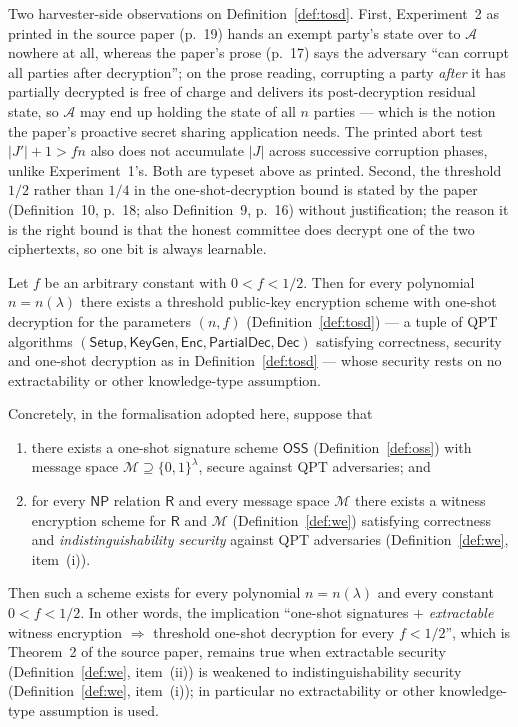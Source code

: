 \documentclass{conjura-conjecture}
\newcommand{\NP}{\mathsf{NP}}
\newcommand{\Rel}{\mathsf{R}}
\newcommand{\Msp}{\mathcal{M}}
\newcommand{\Setup}{\mathsf{Setup}}
\newcommand{\KeyGen}{\mathsf{KeyGen}}
\newcommand{\Enc}{\mathsf{Enc}}
\newcommand{\Dec}{\mathsf{Dec}}
\newcommand{\PartialDec}{\mathsf{PartialDec}}
\newcommand{\OSS}{\mathsf{OSS}}
\begin{document}
\begin{remark}\label{rem:tosd}
Two harvester-side observations on Definition~\ref{def:tosd}. First,
Experiment~2 as printed in the source paper (p.~19) hands an exempt
party's state over to $\mathcal{A}$ nowhere at all, whereas the
paper's prose (p.~17) says the adversary ``can corrupt all parties
after decryption''; on the prose reading, corrupting a party
\emph{after} it has partially decrypted is free of charge and delivers
its post-decryption residual state, so $\mathcal{A}$ may end up
holding the state of all $n$ parties --- which is the notion the
paper's proactive secret sharing application needs. The printed abort
test $\lvert J' \rvert + 1 > f n$ also does not accumulate $\lvert J
\rvert$ across successive corruption phases, unlike Experiment~1's.
Both are typeset above as printed. Second, the threshold $1/2$ rather
than $1/4$ in the one-shot-decryption bound is stated by the paper
(Definition~10, p.~18; also Definition~9, p.~16) without
justification; the reason it is the right bound is that the honest
committee does decrypt one of the two ciphertexts, so one bit is
always learnable.
\end{remark}

\begin{conjecture}\label{conj:main}
Let $f$ be an arbitrary constant with $0 < f < 1/2$. Then for every
polynomial $n = n(\lambda)$ there exists a threshold public-key
encryption scheme with one-shot decryption for the parameters $(n, f)$
(Definition~\ref{def:tosd}) --- a tuple of QPT algorithms $(\Setup,
\KeyGen, \Enc, \PartialDec, \Dec)$ satisfying correctness, security
and one-shot decryption as in Definition~\ref{def:tosd} --- whose
security rests on no extractability or other knowledge-type
assumption.

Concretely, in the formalisation adopted here, suppose that
\begin{enumerate}[leftmargin=1.6em]
  \item[(i)] there exists a one-shot signature scheme $\OSS$
    (Definition~\ref{def:oss}) with message space $\Msp \supseteq
    \{0,1\}^{\lambda}$, secure against QPT adversaries; and
  \item[(ii)] for every $\NP$ relation $\Rel$ and every message space
    $\Msp$ there exists a witness encryption scheme for $\Rel$ and
    $\Msp$ (Definition~\ref{def:we}) satisfying correctness and
    \emph{indistinguishability security} against QPT adversaries
    (Definition~\ref{def:we}, item~(i)).
\end{enumerate}
Then such a scheme exists for every polynomial $n = n(\lambda)$ and
every constant $0 < f < 1/2$. In other words, the implication
``one-shot signatures $+$ \emph{extractable} witness encryption
$\Rightarrow$ threshold one-shot decryption for every $f < 1/2$'',
which is Theorem~2 of the source paper, remains true when extractable
security (Definition~\ref{def:we}, item~(ii)) is weakened to
indistinguishability security (Definition~\ref{def:we}, item~(i)); in
particular no extractability or other knowledge-type assumption is
used.
\end{conjecture}
\end{document}
